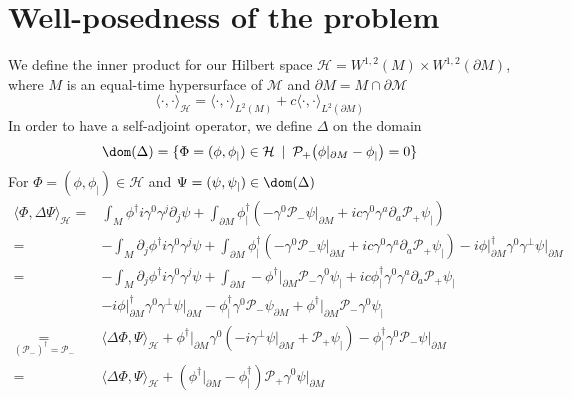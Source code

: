 \section{Well-posedness of the problem}\label{wen-sect-saw}
We define the inner product for our Hilbert space $\mathcal{H} = W^{1,2}(M)\times W^{1,2}(\partial M)$,
where $M$ is an equal-time hypersurface of $\mathcal{M}$ and $\partial M = M\cap \partial \mathcal{M}$
\begin{equation}\label{wen-innerpdt}
\langle \cdot, \cdot \rangle _\mathcal{H} = \langle \cdot, \cdot \rangle _{L^2(M)} + c \langle \cdot, \cdot \rangle _{L^2(\partial M)}
\end{equation}
In order to have a self-adjoint operator, we define $\Delta$ on the domain
\begin{equation*}
\dom( \Delta) = \{ \Phi = (\phi, \phi_|) \in \mathcal{H} \enskip | \enskip \mathcal{P}_+\big(\phi \vert_{\partial M} - \phi_|\big) = 0 \}
\end{equation*}  
For $\Phi = (\phi, \phi_|) \in \mathcal{H}$ and $ \Psi = (\psi, \psi_|)\in\dom(\Delta)$
\begin{equation}
\begin{split}
\langle \Phi, \Delta \Psi \rangle _\mathcal{H}
 = & \int_M \phi^\dagger i \gamma^0 \gamma^j \partial_j \psi 
+ \int_{\partial M} \phi^\dagger_|(  -\gamma^0\mathcal{P}_- \psi\vert_{\partial M} + ic \gamma^0 \gamma^a \partial_a \mathcal{P}_+ \psi_|)   \\
 = & - \int_M \partial_j \phi^\dagger i \gamma^0 \gamma^j \psi 
+ \int_{\partial M} \phi^\dagger_|(-\gamma^0 \mathcal{P}_- \psi\vert_{\partial M} + ic \gamma^0 \gamma^a \partial_a \mathcal{P}_+ \psi_|) 
- i\phi\vert_{\partial M}^\dagger \gamma^0 \gamma^\bot \psi\vert_{\partial M}   \\
= &
- \int_M \partial_j \phi^\dagger i \gamma^0 \gamma^j \psi 
+ \int_{\partial M} - \phi^\dagger\vert_{\partial M}\mathcal{P}_- \gamma^0 \psi_| + ic \phi^\dagger_|\gamma^0 \gamma^a \partial_a \mathcal{P}_+ \psi_|  \\
& - i \phi\vert_{\partial M}^\dagger \gamma^0 \gamma^\bot \psi\vert_{\partial M} 
-\phi_|^\dagger \gamma^0 \mathcal{P}_- \psi_{\partial M} 
+ \phi^\dagger\vert_{\partial M}\mathcal{P}_- \gamma^0 \psi_| \\
\underset{(\mathcal{P}_-)^\dagger = \mathcal{P}_-}{=} 
& \langle \Delta\Phi, \Psi \rangle_\mathcal{H}
+\phi^\dagger\vert_{\partial M} \gamma^0 (-i \gamma^\bot \psi\vert_{\partial M} + \mathcal{P}_+ \psi_|)
- \phi_|^\dagger \gamma^0 \mathcal{P}_- \psi\vert_{\partial M} \\
= & \langle \Delta\Phi, \Psi \rangle_\mathcal{H}
+ (\phi^\dagger\vert_{\partial M} - \phi_|^\dagger)\mathcal{P}_+ \gamma^0 \psi\vert_{\partial M}
\end{split}
\end{equation}
